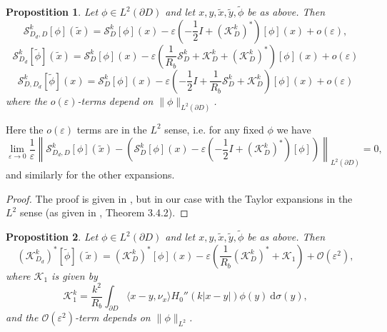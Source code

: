 \documentclass[a4paper]{article}
\newtheorem{prop}{Propostition}
\theoremstyle{definition}
\renewcommand{\S}{\mathcal{S}}
\newcommand{\K}{\mathcal{K}}
\renewcommand{\O}{\mathcal{O}}
\renewcommand{\epsilon}{\varepsilon}
\newcommand{\dx}{\: \mathrm{d}}
\begin{document}
\begin{prop}\label{prop:asympsingle}
	Let $\phi \in L^2(\partial D)$ and let $x,y,\tilde{x},\tilde{y},\tilde{\phi}$ be as above. Then 
\begin{equation} \label{eq:asympSdD}
\S_{D_d,D}^k[\phi](\tilde{x}) = \S_D^k[\phi](x) -\epsilon \left(-\frac{1}{2}I + \left(\K_D^k\right)^*\right)[\phi](x) + o(\epsilon),
\end{equation}
\begin{equation} \label{eq:asympSd}
\S_{D_d}^k[\tilde{\phi}](\tilde{x}) = \S_D^k[\phi](x) - \epsilon \left(\frac{1}{R_b}\S_D^k + \K_D^k + \left(\K_D^k\right)^*\right)[\phi](x) + o(\epsilon)
\end{equation}
\begin{equation} \label{eq:asympSDd}
\S_{D,D_d}^k[\tilde{\phi}](x) = \S_D^k[\phi](x) - \epsilon \left(-\frac{1}{2}I+ \frac{1}{R_b}\S_D^k + \K_D^k \right)[\phi](x) + o(\epsilon)
\end{equation}
where the $o(\epsilon)$-terms depend on $\|\phi\|_{L^2(\partial D)}$.
\end{prop}
Here the $o(\epsilon)$ terms are in the $L^2$ sense, i.e. for any fixed $\phi$ we have 
\begin{equation*}
	\lim_{\epsilon \rightarrow 0} \frac{1}{\epsilon}\left\| \S_{D_d,D}^k[\phi](\tilde{x}) -\left( \S_D^k[\phi](x) -\epsilon \left(-\frac{1}{2}I + \left(\K_D^k\right)^*\right)[\phi]\right) \right\|_{L^2(\partial D)} = 0,
\end{equation*}
and similarly for the other expansions.
\begin{proof}
The proof is given in \cite{asymptotics}, but in our case with the Taylor expansions in the $L^2$ sense (as given in \cite{weakdifffcn}, Theorem 3.4.2).
\end{proof}
\begin{prop} \label{prop:asympK}
	Let $\phi \in L^2(\partial D)$ and let $x,y,\tilde{x},\tilde{y},\tilde{\phi}$ be as above. Then 
	\begin{equation} \label{eq:asympK}
	\left(\K_{D_d}^k\right)^*[\tilde{\phi}](\tilde{x}) = \left(\K_{D}^k\right)^*[\phi](x) - \epsilon \left(\frac{1}{R_b}\left(\K_D^k\right)^* +\K_1\right) + \O(\epsilon^2),
	\end{equation}
	where $\K_1$ is given by
	\begin{equation}
	\K_1^k = \frac{k^2}{R_b} \int_{\partial D} \langle x-y,\nu_x \rangle H_0''(k|x-y|)\phi(y)\dx \sigma(y),
	\end{equation}
	and the $\O(\epsilon^2)$-term depends on $\|\phi\|_{L^2}$.
\end{prop}
\end{document}
